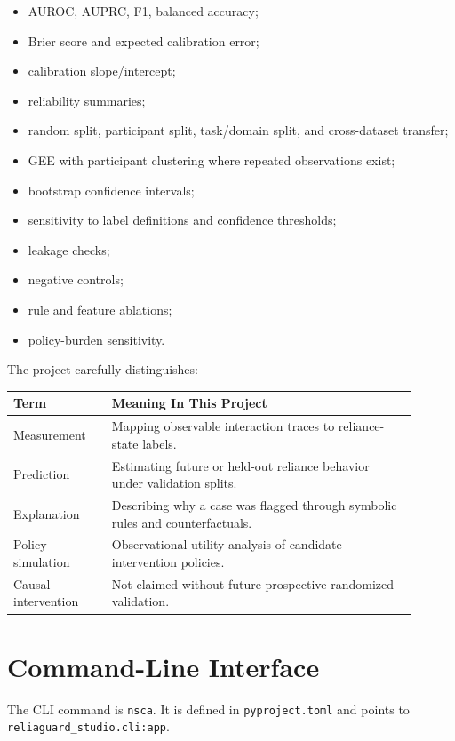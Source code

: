 \documentclass[11pt]{article}
\newcommand{\codepath}[1]{\nolinkurl{#1}}
\begin{document}
\begin{itemize}[leftmargin=*]
  \item AUROC, AUPRC, F1, balanced accuracy;
  \item Brier score and expected calibration error;
  \item calibration slope/intercept;
  \item reliability summaries;
  \item random split, participant split, task/domain split, and cross-dataset transfer;
  \item GEE with participant clustering where repeated observations exist;
  \item bootstrap confidence intervals;
  \item sensitivity to label definitions and confidence thresholds;
  \item leakage checks;
  \item negative controls;
  \item rule and feature ablations;
  \item policy-burden sensitivity.
\end{itemize}

The project carefully distinguishes:

\begin{longtable}{p{0.22\linewidth} p{0.68\linewidth}}
\toprule
\textbf{Term} & \textbf{Meaning In This Project} \\
\midrule
Measurement & Mapping observable interaction traces to reliance-state labels. \\
Prediction & Estimating future or held-out reliance behavior under validation splits. \\
Explanation & Describing why a case was flagged through symbolic rules and counterfactuals. \\
Policy simulation & Observational utility analysis of candidate intervention policies. \\
Causal intervention & Not claimed without future prospective randomized validation. \\
\bottomrule
\end{longtable}

\section{Command-Line Interface}

The CLI command is \codepath{nsca}. It is defined in \codepath{pyproject.toml} and points to \codepath{reliaguard\_studio.cli:app}.
\end{document}
